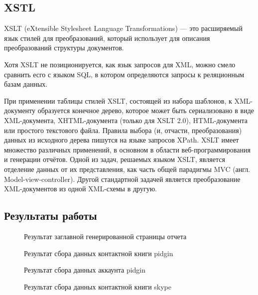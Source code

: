 \subsection{XSTL}

XSLT (eXtensible Stylesheet Language Transformations) — это расширяемый язык стилей для преобразований, который использует для описания преобразований структуры документов.\cite{valikov}

Хотя XSLT не позиционируется, как язык запросов для XML, можно смело сравнить есго с языком SQL, в котором определяются запросы к реляционным базам данных.\cite{valikov}

При применении таблицы стилей XSLT, состоящей из набора шаблонов, к XML-документу образуется конечное дерево, которое может быть сериализовано в виде XML-документа, XHTML-документа (только для XSLT 2.0), HTML-документа или простого текстового файла. Правила выбора (и, отчасти, преобразования) данных из исходного дерева пишутся на языке запросов XPath.
XSLT имеет множество различных применений, в основном в области веб-программирования и генерации отчётов. Одной из задач, решаемых языком XSLT, является отделение данных от их представления, как часть общей парадигмы MVC (англ. Model-view-controller). Другой стандартной задачей является преобразование XML-документов из одной XML-схемы в другую.\cite{valikov}

\subsection{Результаты работы}

\begin{figure}[h]
\caption{Результат заглавной генерированной страницы отчета}
\label{pic:xml_to_xslt1}
\end{figure}

\begin{figure}[h]
\caption{Результат сбора данных контактной книги pidgin}
\label{pic:xml_to_xslt2}
\end{figure}

\begin{figure}[h]
\caption{Результат сбора данных аккаунта pidgin}
\label{pic:xml_to_xslt3}
\end{figure}

\begin{figure}[h]
\caption{Результат сбора данных контактной книги skype}
\label{pic:xml_to_xslt4}
\end{figure}

